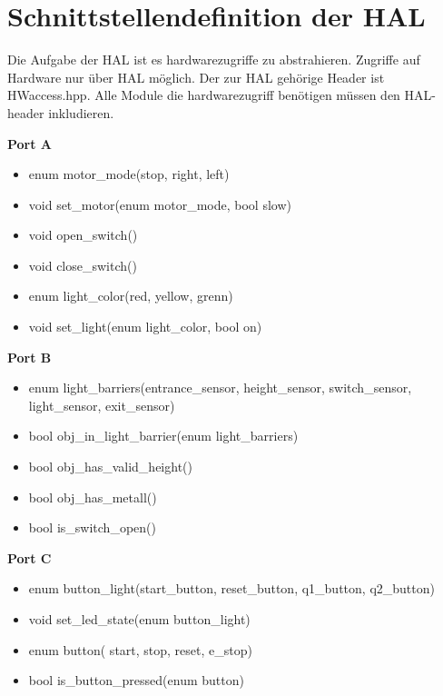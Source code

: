 \documentclass[a4paper,10pt]{article}\\
\begin{document}
  \section*{Schnittstellendefinition der HAL}
  Die Aufgabe der HAL ist es hardwarezugriffe zu abstrahieren. Zugriffe auf Hardware nur über HAL möglich.
  Der zur HAL gehörige Header ist HWaccess.hpp. Alle Module die hardwarezugriff benötigen müssen den HAL-header inkludieren. \newline
   
  \textbf{\newline Port A}
  \begin{itemize}
    \item enum motor\_mode(stop, right, left)
    \item void set\_motor(enum motor\_mode, bool slow) 
    \item void open\_switch()
    \item void close\_switch()
    \item enum light\_color(red, yellow, grenn)
    \item void set\_light(enum light\_color, bool on) 
  \end{itemize}
  
  \textbf{\newline Port B}
  \begin{itemize}
	\item enum light\_barriers(entrance\_sensor, height\_sensor, switch\_sensor, light\_sensor, exit\_sensor)
    \item bool obj\_in\_light\_barrier(enum light\_barriers)
    \item bool obj\_has\_valid\_height()
    \item bool obj\_has\_metall()
    \item bool is\_switch\_open()
  \end{itemize}
  
  \textbf{\newline Port C}
  \begin{itemize}
    \item enum button\_light(start\_button, reset\_button, q1\_button, q2\_button)
    \item void set\_led\_state(enum button\_light)
    \item enum button( start, stop, reset, e\_stop)
     \item bool is\_button\_pressed(enum button)
  \end{itemize}
\end{document}
